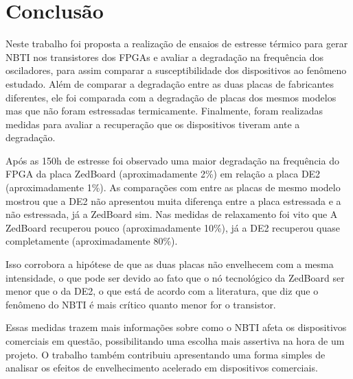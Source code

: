 \chapter{Conclusão}
\label{Conclusao}

Neste trabalho foi proposta a realização de ensaios de estresse térmico para gerar NBTI nos transistores dos FPGAs e avaliar a degradação na frequência dos osciladores, para assim comparar a susceptibilidade dos dispositivos ao fenômeno estudado. Além de comparar a degradação entre as duas placas de fabricantes diferentes, ele foi comparada com a degradação de placas dos mesmos modelos mas que não foram estressadas termicamente. Finalmente, foram realizadas medidas para avaliar a recuperação que os dispositivos tiveram ante a degradação.

Após as 150h de estresse foi observado uma maior degradação na frequência do FPGA da placa ZedBoard (aproximadamente 2\%) em relação a placa DE2 (aproximadamente 1\%). As comparações com entre as placas de mesmo modelo mostrou que a DE2 não apresentou muita diferença entre a placa estressada e a não estressada, já a ZedBoard sim. Nas medidas de relaxamento foi vito que A ZedBoard recuperou pouco (aproximadamente 10\%), já a DE2 recuperou quase completamente (aproximadamente 80\%).

Isso corrobora a hipótese de que as duas placas não envelhecem com a mesma intensidade, o que pode ser devido ao fato que o nó tecnológico da ZedBoard ser menor que o da DE2, o que está de acordo com a literatura, que diz que o fenômeno do NBTI é mais crítico quanto menor for o transistor.


Essas medidas trazem mais informações sobre como o NBTI afeta os dispositivos comerciais em questão, possibilitando uma escolha mais assertiva na hora de um projeto. O trabalho também contribuiu apresentando uma forma simples de analisar os efeitos de envelhecimento acelerado em dispositivos comerciais.

